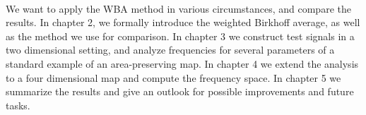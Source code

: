 \\
We want to apply the WBA method in various circumstances, and compare the results. 
In chapter 2, we formally introduce the weighted Birkhoff average, as well as the method we use for comparison.
In chapter 3 we construct test signals in a two dimensional setting, and analyze frequencies for several parameters of a standard example of an area-preserving map.
In chapter 4 we extend the analysis to a four dimensional map and compute the frequency space. %
In chapter 5 we summarize the results and give an outlook for possible improvements and future tasks.


